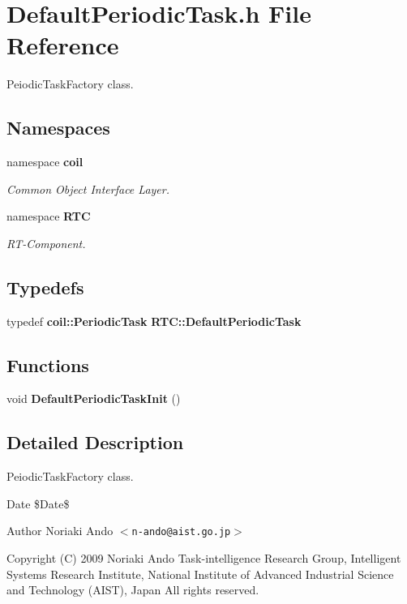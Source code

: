 \section{DefaultPeriodicTask.h File Reference}
\label{DefaultPeriodicTask_8h}


PeiodicTaskFactory class.  


\subsection*{Namespaces}
\begin{DoxyCompactItemize}
\item 
namespace {\bf coil}


\begin{DoxyCompactList}\small\item\em Common Object Interface Layer. \item\end{DoxyCompactList}

\item 
namespace {\bf RTC}


\begin{DoxyCompactList}\small\item\em RT-\/Component. \item\end{DoxyCompactList}

\end{DoxyCompactItemize}
\subsection*{Typedefs}
\begin{DoxyCompactItemize}
\item 
typedef {\bf coil::PeriodicTask} {\bf RTC::DefaultPeriodicTask}
\end{DoxyCompactItemize}
\subsection*{Functions}
\begin{DoxyCompactItemize}
\item 
void {\bf DefaultPeriodicTaskInit} ()
\end{DoxyCompactItemize}


\subsection{Detailed Description}
PeiodicTaskFactory class. \begin{DoxyDate}{Date}
\$Date\$ 
\end{DoxyDate}
\begin{DoxyAuthor}{Author}
Noriaki Ando $<${\tt n-\/ando@aist.go.jp}$>$
\end{DoxyAuthor}
Copyright (C) 2009 Noriaki Ando Task-\/intelligence Research Group, Intelligent Systems Research Institute, National Institute of Advanced Industrial Science and Technology (AIST), Japan All rights reserved.

